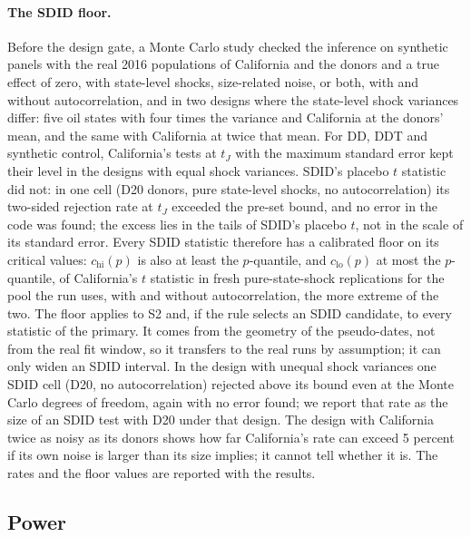 \paragraph{The SDID floor.} Before the design gate, a Monte Carlo study checked the inference on
synthetic panels with the real 2016 populations of California and the donors and a true effect of
zero, with state-level shocks, size-related noise, or both, with and without autocorrelation, and
in two designs where the state-level shock variances differ: five oil states with four times the
variance and California at the donors' mean, and the same with California at twice that mean. For
DD, DDT and synthetic control, California's tests at $t_J$ with the maximum standard error kept
their level in the designs with equal shock variances. SDID's placebo $t$ statistic did not: in one
cell (D20 donors, pure state-level shocks, no autocorrelation) its two-sided rejection rate at
$t_J$ exceeded the pre-set bound, and no error in the code was found; the excess lies in the tails
of SDID's placebo $t$, not in the scale of its standard error. Every SDID statistic therefore has a
calibrated floor on its critical values: $c_{\mathrm{hi}}(p)$ is also at least the
$p$-quantile, and $c_{\mathrm{lo}}(p)$ at most the $p$-quantile, of California's $t$ statistic in
fresh pure-state-shock replications for the pool the run uses, with and without autocorrelation,
the more extreme of the two. The floor applies to S2 and, if the rule selects an SDID candidate, to
every statistic of the primary. It comes from the geometry of the pseudo-dates, not from the real
fit window, so it transfers to the real runs by assumption; it can only widen an SDID interval. In
the design with unequal shock variances one SDID cell (D20, no autocorrelation) rejected above its
bound even at the Monte Carlo degrees of freedom, again with no error found; we report that rate as
the size of an SDID test with D20 under that design. The design with California twice as noisy
as its donors shows how far California's rate can exceed 5 percent if its own noise is larger than
its size implies; it cannot tell whether it is. The rates and the floor values are reported with
the results.

\subsection{Power}
\label{sec:power}

